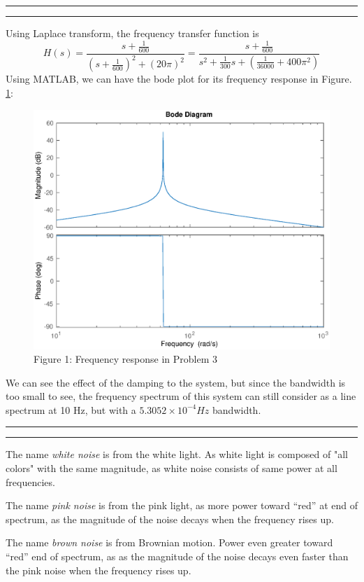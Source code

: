 \documentclass[11pt]{article}
\newcounter{questionCounter}
\newcounter{partCounter}[questionCounter]
\newenvironment{question}[2][\arabic{questionCounter}]{%
    \addtocounter{questionCounter}{1}%
    \setcounter{partCounter}{0}%
    \vspace{.25in} \hrule \vspace{0.5em}%
        \noindent{\bf #2}%
    \vspace{0.8em} \hrule \vspace{.10in}%
}{}
\begin{document}
\begin{question}{Problem 3}
Using Laplace transform, the frequency transfer function is
\begin{equation*}
    H(s) = \frac{s + \frac{1}{600}}{(s+\frac{1}{600})^2 + (20\pi)^2} = \frac{s + \frac{1}{600}}{s^2 + \frac{1}{300}s + (\frac{1}{36000}+400\pi^2)}
\end{equation*}
Using MATLAB, we can have the bode plot for its frequency response in Figure. \ref{fig1}:
\begin{figure}[h]
    \includegraphics[width=12cm]{p3.eps}
    \centering
    \caption{Figure 1: Frequency response in Problem 3}
    \label{fig1}
\end{figure}
We can see the effect of the damping to the system, but since the bandwidth is too small to see, the frequency spectrum of this system can still consider as a line spectrum at 10 Hz, but with a $5.3052 \times 10^{-4} Hz$ bandwidth. 
\end{question}

\begin{question}{Problem 4}
    The name \textit{white noise} is from the white light. As white light is composed of "all colors" with the same magnitude, as white noise consists of same power at all frequencies.
    
    The name \textit{pink noise} is from the pink light, as more power toward “red” at end of spectrum, as the magnitude of the noise decays when the frequency rises up. 
    
    The name \textit{brown noise} is from Brownian motion. Power even greater toward “red” end of spectrum, as as the magnitude of the noise decays even faster than the pink noise when the frequency rises up.
\end{question}
\end{document}
